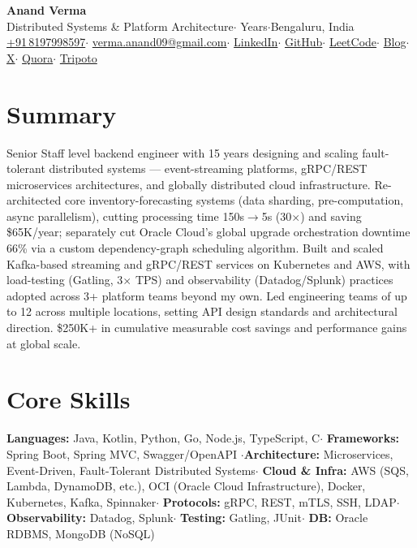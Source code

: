 \documentclass[9pt, letterpaper]{article}
\begin{document}
\pagestyle{empty}

\begin{center}
{\large\bfseries\color{dark}Anand Verma}\\[2pt]
{\small\color{light}
  Distributed Systems \& Platform Architecture\enspace$\cdot$ Years\enspace$\cdot$\enspace Bengaluru, India}\\[1pt]
{\small\color{mid}
  \href{tel:+918197998597}{+91\,8197998597}\enspace$\cdot$\enspace
  \href{mailto:verma.anand09@gmail.com}{verma.anand09@gmail.com}\enspace$\cdot$\enspace
  \href{https://www.linkedin.com/in/vermaanand}{\color{accent}LinkedIn}\enspace$\cdot$\enspace
  \href{https://github.com/pyav}{\color{accent}GitHub}\enspace$\cdot$\enspace
  \href{https://leetcode.com/pyav/}{\color{accent}LeetCode}\enspace$\cdot$\enspace
  \href{https://pyav.blogspot.com}{\color{accent}Blog}\enspace$\cdot$\enspace
  \href{https://x.com/pyav}{\color{accent}X}\enspace$\cdot$\enspace
  \href{https://www.quora.com/profile/Anand-Verma-28}{\color{accent}Quora}\enspace$\cdot$\enspace
  \href{https://www.tripoto.com/profile/anandverma}{\color{accent}Tripoto}}
\end{center}
\vspace{-3pt}

\section{Summary}
Senior Staff level backend engineer with 15 years designing and scaling fault-tolerant distributed
systems --- event-streaming platforms, gRPC/REST microservices architectures, and globally distributed cloud infrastructure. Re-architected core inventory-forecasting systems (data sharding, pre-computation, async parallelism), cutting processing time 150s$\rightarrow$5s (30$\times$) and saving \$65K/year; separately cut Oracle Cloud's global upgrade orchestration downtime 66\% via a custom dependency-graph scheduling algorithm. Built and scaled Kafka-based streaming and gRPC/REST services on Kubernetes and AWS, with load-testing (Gatling, 3$\times$ TPS) and observability (Datadog/Splunk) practices adopted across 3+ platform teams beyond my own. Led engineering teams of up to 12 across multiple locations, setting API design standards and architectural direction. \$250K+ in cumulative measurable cost savings and performance gains at global scale.
\section{Core Skills}
\textbf{Languages:} Java, Kotlin, Python, Go, Node.js, TypeScript, C\enspace$\cdot$\enspace
\textbf{Frameworks:} Spring Boot, Spring MVC, Swagger/OpenAPI
\enspace$\cdot$\enspace \textbf{Architecture:} Microservices, Event-Driven, Fault-Tolerant Distributed Systems\enspace$\cdot$\enspace
\textbf{Cloud \& Infra:} AWS (SQS, Lambda, DynamoDB, etc.), OCI (Oracle Cloud
Infrastructure), Docker, Kubernetes, Kafka, Spinnaker\enspace$\cdot$\enspace
\textbf{Protocols:} gRPC, REST, mTLS, SSH, LDAP\enspace$\cdot$\enspace
\textbf{Observability:} Datadog, Splunk\enspace$\cdot$\enspace
\textbf{Testing:} Gatling, JUnit\enspace$\cdot$\enspace
\textbf{DB:} Oracle RDBMS, MongoDB (NoSQL)
\end{document}
